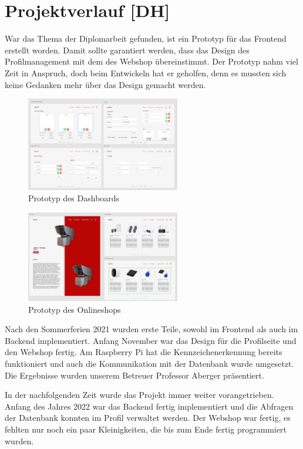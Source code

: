 \section{Projektverlauf [DH]}
War das Thema der Diplomarbeit gefunden, ist ein Prototyp für das Frontend erstellt worden. Damit sollte garantiert werden, dass das Design des Profilmanagement mit dem des Webshop übereinstimmt. Der Prototyp nahm viel Zeit in Anspruch, doch beim Entwickeln hat er geholfen, denn es mussten sich keine Gedanken mehr über das Design gemacht werden.
\begin{figure}[H]
    \centering
    \includegraphics[width=0.6\textwidth]{pics/DashboardPrototyp.png}
    \caption{Prototyp des Dashboards}
  \end{figure}
  \begin{figure}[H]
    \centering
    \includegraphics[width=0.6\textwidth]{pics/ShopPrototyp.png}
    \caption{Prototyp des Onlineshops}
  \end{figure}
  \newpage

Nach den Sommerferien 2021 wurden erste Teile, sowohl im Frontend als auch im Backend implementiert. Anfang November war das Design für die Profilseite und den Webshop fertig. Am Raspberry Pi hat die Kennzeichenerkennung bereits funktioniert und auch die Kommunikation mit der Datenbank wurde umgesetzt. Die Ergebnisse wurden unserem Betreuer Professor Aberger präsentiert.

In der nachfolgenden Zeit wurde das Projekt immer weiter vorangetrieben.  Anfang des Jahres 2022 war das Backend fertig implementiert und die Abfragen der Datenbank konnten im Profil verwaltet werden. Der Webshop war fertig, es fehlten nur noch ein paar Kleinigkeiten, die bis zum Ende fertig programmiert wurden. 

